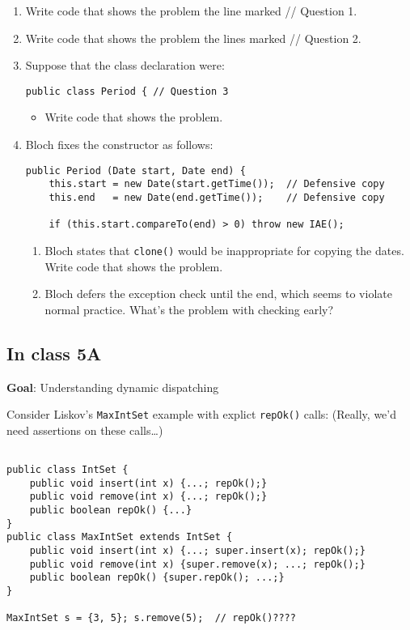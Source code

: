 \documentclass[11pt]{article}
\begin{document}
\begin{enumerate}
\item Write code that shows the problem the line marked // Question 1.
\item Write code that shows the problem the lines marked // Question 2.
\item Suppose that the class declaration were:
\begin{verbatim}
public class Period { // Question 3
\end{verbatim}
\begin{itemize}
\item Write code that shows the problem.
\end{itemize}
\item Bloch fixes the constructor as follows:
\begin{verbatim}
public Period (Date start, Date end) {
    this.start = new Date(start.getTime());  // Defensive copy
    this.end   = new Date(end.getTime());    // Defensive copy

    if (this.start.compareTo(end) > 0) throw new IAE();
\end{verbatim}
\begin{enumerate}
\item Bloch states that \texttt{clone()} would be inappropriate for copying the dates. Write code that shows the problem.
\item Bloch defers the exception check until the end, which seems to violate normal practice. What's the problem with checking early?
\end{enumerate}
\end{enumerate}

\subsection{In class 5A}
\label{sec:org4d8c866}
\textbf{Goal}: Understanding dynamic dispatching

Consider Liskov's \texttt{MaxIntSet} example with explict \texttt{repOk()} calls: (Really, we'd need assertions on these calls\ldots{})

\begin{verbatim}

public class IntSet {
    public void insert(int x) {...; repOk();}
    public void remove(int x) {...; repOk();}
    public boolean repOk() {...}
}
public class MaxIntSet extends IntSet {
    public void insert(int x) {...; super.insert(x); repOk();}
    public void remove(int x) {super.remove(x); ...; repOk();}
    public boolean repOk() {super.repOk(); ...;}
}

MaxIntSet s = {3, 5}; s.remove(5);  // repOk()????
\end{verbatim}
\end{document}
